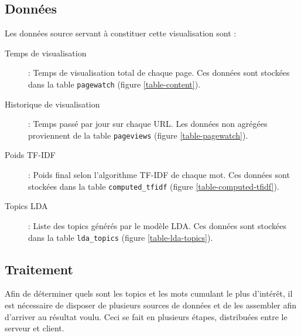 	\subsection{Données}

		Les données source servant à constituer cette visualisation sont :
		\begin{description}
			\item[Temps de visualisation] : Temps de visualisation total de chaque page. Ces données sont stockées dans la table \texttt{pagewatch} (figure \ref{table-content}).
			\item[Historique de visualisation] : Temps passé par jour sur chaque URL. Les données non agrégées proviennent de la table \texttt{pageviews} (figure \ref{table-pagewatch}).
			\item[Poids TF-IDF] : Poids final selon l'algorithme TF-IDF de chaque mot. Ces données sont stockées dans la table \texttt{computed\_tfidf} (figure \ref{table-computed-tfidf}).
			\item[Topics LDA] : Liste des topics générés par le modèle LDA. Ces données sont stockées dans la table \texttt{lda\_topics} (figure \ref{table-lda-topics}).
		\end{description}

	\subsection{Traitement}

		Afin de déterminer quels sont les topics et les mots cumulant le plus d'intérêt, il est nécessaire de disposer de plusieurs sources de données et de les assembler afin d'arriver au résultat voulu. Ceci se fait en plusieurs étapes, distribuées entre le serveur et client.

